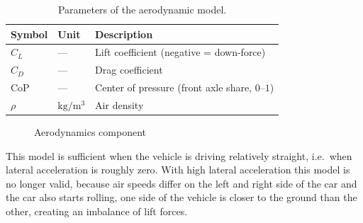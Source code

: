\begin{table}[!ht]
	\centering
	\begin{tabular}{lll}
		\hline
		\textbf{Symbol} & \textbf{Unit}     & \textbf{Description}                            \\
		\hline
		$C_L$           & ---               & Lift coefficient (negative = down-force)         \\
		$C_D$           & ---               & Drag coefficient                                \\
		$\mathrm{CoP}$  & ---               & Center of pressure (front axle share, $0$--$1$) \\
		$\rho$          & $\mathrm{kg/m^3}$ & Air density                                     \\
		\hline
	\end{tabular}
	\caption{Parameters of the aerodynamic model.}
	\label{tab:aero-params}
\end{table}

\begin{figure}[H]
    \centering
    \caption{Aerodynamics component}\label{fig:aero}
\end{figure}

This model is sufficient when the vehicle is driving relatively straight, i.e.\ when lateral acceleration is roughly zero. With high lateral acceleration this model is no longer valid, because air speeds differ on the left and right side of the car and the car also starts rolling, one side of the vehicle is closer to the ground than the other, creating an imbalance of lift forces.

